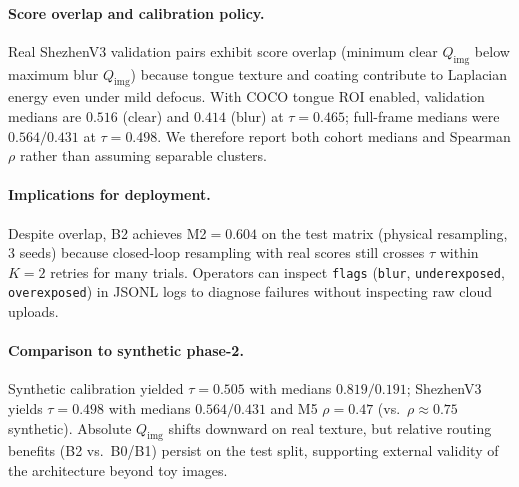\paragraph{Score overlap and calibration policy.}
Real ShezhenV3 validation pairs exhibit score overlap (minimum clear $Q_{\mathrm{img}}$ below maximum blur $Q_{\mathrm{img}}$) because tongue texture and coating contribute to Laplacian energy even under mild defocus.
With COCO tongue ROI enabled, validation medians are $0.516$ (clear) and $0.414$ (blur) at $\tau{=}0.465$; full-frame medians were $0.564/0.431$ at $\tau{=}0.498$.
We therefore report both cohort medians and Spearman $\rho$ rather than assuming separable clusters.

\paragraph{Implications for deployment.}
Despite overlap, B2 achieves M2$=0.604$ on the test matrix (physical resampling, 3 seeds) because closed-loop resampling with real scores still crosses $\tau$ within $K{=}2$ retries for many trials.
Operators can inspect \texttt{flags} (\texttt{blur}, \texttt{underexposed}, \texttt{overexposed}) in JSONL logs to diagnose failures without inspecting raw cloud uploads.

\paragraph{Comparison to synthetic phase-2.}
Synthetic calibration yielded $\tau{=}0.505$ with medians $0.819/0.191$; ShezhenV3 yields $\tau{=}0.498$ with medians $0.564/0.431$ and M5 $\rho{=}0.47$ (vs.\ $\rho{\approx}0.75$ synthetic).
Absolute $Q_{\mathrm{img}}$ shifts downward on real texture, but relative routing benefits (B2 vs.\ B0/B1) persist on the test split, supporting external validity of the architecture beyond toy images.
